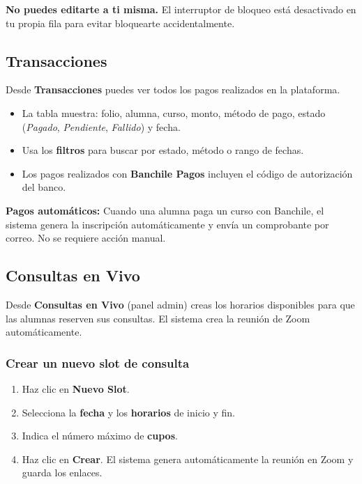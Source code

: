\documentclass[a4paper,11pt]{article}
\begin{document}
\begin{warnbox}
\textbf{No puedes editarte a ti misma.} El interruptor de bloqueo est\'a
desactivado en tu propia fila para evitar bloquearte accidentalmente.
\end{warnbox}

\subsection{Transacciones}

Desde \textbf{Transacciones} puedes ver todos los pagos realizados en la plataforma.

\begin{itemize}
  \item La tabla muestra: folio, alumna, curso, monto, m\'etodo de pago,
        estado (\emph{Pagado}, \emph{Pendiente}, \emph{Fallido}) y fecha.
  \item Usa los \textbf{filtros} para buscar por estado, m\'etodo o rango de fechas.
  \item Los pagos realizados con \textbf{Banchile Pagos} incluyen el c\'odigo
        de autorizaci\'on del banco.
\end{itemize}

\begin{infobox}
\textbf{Pagos autom\'aticos:} Cuando una alumna paga un curso con Banchile,
el sistema genera la inscripci\'on autom\'aticamente y env\'ia un comprobante
por correo. No se requiere acci\'on manual.
\end{infobox}

\subsection{Consultas en Vivo}

Desde \textbf{Consultas en Vivo} (panel admin) creas los horarios disponibles
para que las alumnas reserven sus consultas. El sistema crea la reuni\'on
de Zoom autom\'aticamente.

\subsubsection{Crear un nuevo slot de consulta}

\begin{enumerate}
  \item Haz clic en \textbf{Nuevo Slot}.
  \item Selecciona la \textbf{fecha} y los \textbf{horarios} de inicio y fin.
  \item Indica el n\'umero m\'aximo de \textbf{cupos}.
  \item Haz clic en \textbf{Crear}. El sistema genera autom\'aticamente
        la reuni\'on en Zoom y guarda los enlaces.
\end{enumerate}
\end{document}
